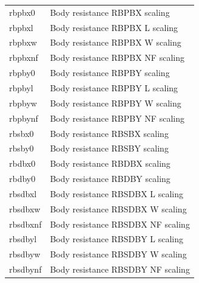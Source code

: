 \begin{longtable}{l l}
{\small rbpbx0} & {\small Body resistance RBPBX  scaling} \\
{\small rbpbxl} & {\small Body resistance RBPBX L scaling} \\
{\small rbpbxw} & {\small Body resistance RBPBX W scaling} \\
{\small rbpbxnf} & {\small Body resistance RBPBX NF scaling} \\
{\small rbpby0} & {\small Body resistance RBPBY  scaling} \\
{\small rbpbyl} & {\small Body resistance RBPBY L scaling} \\
{\small rbpbyw} & {\small Body resistance RBPBY W scaling} \\
{\small rbpbynf} & {\small Body resistance RBPBY NF scaling} \\

{\small rbsbx0} & {\small Body resistance RBSBX  scaling} \\
{\small rbsby0} & {\small Body resistance RBSBY  scaling} \\
{\small rbdbx0} & {\small Body resistance RBDBX  scaling} \\
{\small rbdby0} & {\small Body resistance RBDBY  scaling} \\

{\small rbsdbxl} & {\small Body resistance RBSDBX L scaling} \\
{\small rbsdbxw} & {\small Body resistance RBSDBX W scaling} \\
{\small rbsdbxnf} & {\small Body resistance RBSDBX NF scaling} \\
{\small rbsdbyl} & {\small Body resistance RBSDBY L scaling} \\
{\small rbsdbyw} & {\small Body resistance RBSDBY W scaling} \\
{\small rbsdbynf} & {\small Body resistance RBSDBY NF scaling} \\


\end{longtable}
